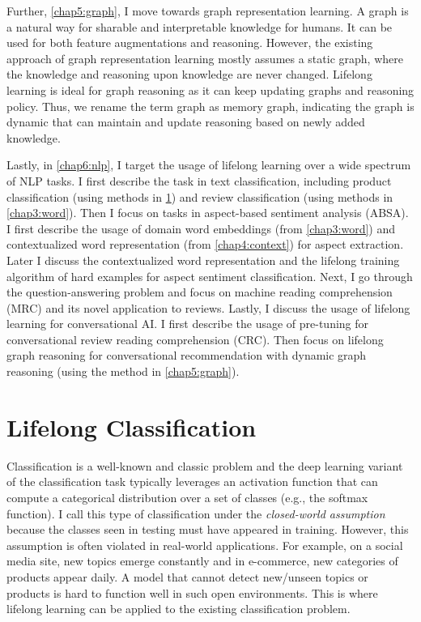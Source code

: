 Further, \ref{chap5:graph}, I move towards graph representation learning.
A graph is a natural way for sharable and interpretable knowledge for humans.
It can be used for both feature augmentations and reasoning.
However, the existing approach of graph representation learning mostly assumes a static graph, where the knowledge and reasoning upon knowledge are never changed.
Lifelong learning is ideal for graph reasoning as it can keep updating graphs and reasoning policy.
Thus, we rename the term graph as memory graph, indicating the graph is dynamic that can maintain and update reasoning based on newly added knowledge.

Lastly, in \ref{chap6:nlp}, I target the usage of lifelong learning over a wide spectrum of NLP tasks.
I first describe the task in text classification, including product classification (using methods in \ref{chap2:open}) and review classification (using methods in \ref{chap3:word}).
Then I focus on tasks in aspect-based sentiment analysis (ABSA).
I first describe the usage of domain word embeddings (from \ref{chap3:word}) and contextualized word representation (from \ref{chap4:context}) for aspect extraction.
Later I discuss the contextualized word representation and the lifelong training algorithm of hard examples for aspect sentiment classification.
Next, I go through the question-answering problem and focus on machine reading comprehension (MRC) and its novel application to reviews.
Lastly, I discuss the usage of lifelong learning for conversational AI. 
I first describe the usage of pre-tuning for conversational review reading comprehension (CRC).
Then focus on lifelong graph reasoning for conversational recommendation with dynamic graph reasoning (using the method in \ref{chap5:graph}).

\chapter{Lifelong Classification}
\label{chap2:open}

Classification is a well-known and classic problem and the deep learning variant of the classification task typically leverages an activation function that can compute a categorical distribution over a set of classes (e.g., the softmax function).
I call this type of classification under the \textit{closed-world assumption} because the classes seen in testing must have appeared in training. However, this assumption is often violated in real-world applications. For example, on a social media site, new topics emerge constantly and in e-commerce, new categories of products appear daily. 
A model that cannot detect new/unseen topics or products is hard to function well in such open environments.  
This is where lifelong learning can be applied to the existing classification problem.

